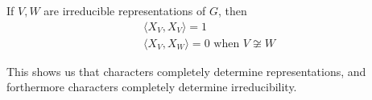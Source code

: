 \documentclass{memoir}
\begin{document}

\begin{thm}
	If \(V,W\) are irreducible representations of \(G\), then
	\begin{align*}
		\langle X_V,X_V \rangle = 1\\
		\langle X_V,X_W \rangle = 0 \text{ when }V\not\cong W
	\end{align*}
\end{thm}
This shows us that characters completely determine representations, and forthermore characters completely determine irreducibility.
\end{document}
